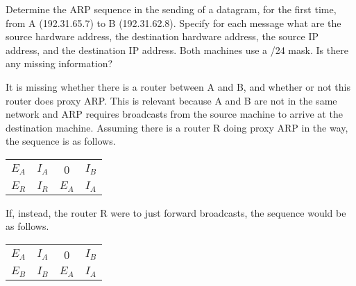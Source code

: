 \begin{Exercise}
Determine the ARP sequence in the sending of a datagram, for the first time, from A (192.31.65.7) to B (192.31.62.8).
Specify for each message what are the source hardware address, the destination hardware address, the source IP address, and the destination IP address.
Both machines use a /24 mask. Is there any missing information?
\end{Exercise}
\begin{Answer}
It is missing whether there is a router between A and B, and whether or not this router does proxy ARP.
This is relevant because A and B are not in the same network and ARP requires broadcasts from the source machine to arrive at the destination machine.
Assuming there is a router R doing proxy ARP in the way, the sequence is as follows.

\begin{center}
\begin{tabular}{c|c|c|c}
    \(E_A\) & \(I_A\) &       0 & \(I_B\) \\
    \(E_R\) & \(I_R\) & \(E_A\) & \(I_A\) \\
\end{tabular}
\end{center}

If, instead, the router R were to just forward broadcasts, the sequence would be as follows.

\begin{center}
\begin{tabular}{c|c|c|c}
    \(E_A\) & \(I_A\) &       0 & \(I_B\) \\
    \(E_B\) & \(I_B\) & \(E_A\) & \(I_A\) \\
\end{tabular}
\end{center}
\end{Answer}

